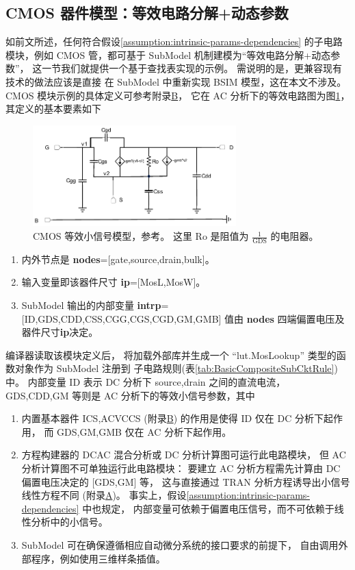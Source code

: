 \subsection{CMOS 器件模型：等效电路分解+动态参数}\label{subsec:cmos-model}
如前文所述，任何符合假设\ref{assumption:intrinsic-params-dependencies}
的子电路模块，例如 CMOS 管，都可基于 SubModel 机制建模为“等效电路分解+动态参数”，
这一节我们就提供一个基于查找表实现的示例。
需说明的是，更兼容现有技术的做法应该是直接
在 SubModel 中重新实现 BSIM 模型\cite{chauhan2012bsim}，这在本文不涉及。
CMOS 模块示例的具体定义可参考附录\hyperref[appendix:mos-subckt]{B}，
它在 AC 分析下的等效电路图为图\ref{fig:mos-small-signal-model-2}，
其定义的基本要素如下
\begin{figure}[htpb]
  \centering
  \includegraphics[width=0.7\textwidth]{fig/mos-small-signal-model-2.pdf}
  \caption{CMOS 等效小信号模型，参考\cite[Figure 2.39]{razavi2002design}。
  这里 Ro 是阻值为 $\frac{1}{\text{GDS}}$ 的电阻器。}
  \label{fig:mos-small-signal-model-2}
\end{figure}
\begin{enumerate}[partopsep=0pt,topsep=0pt,itemsep=0pt,parsep=0pt]
  \item 内外节点是 \textbf{nodes}=[gate,source,drain,bulk]。
  \item 输入变量即该器件尺寸 \textbf{ip}=[MosL,MosW]。
  \item SubModel 输出的内部变量
    \textbf{intrp}=[ID,GDS,CDD,CSS,CGG,CGS,CGD,GM,GMB]
    值由 \textbf{nodes} 四端偏置电压及器件尺寸\textbf{ip}决定。
\end{enumerate}
编译器读取该模块定义后，
将加载外部库并生成一个 “lut.MosLookup” 类型的函数对象作为 SubModel 注册到
子电路规则(表\ref{tab:BasicCompositeSubCktRule})中。
内部变量 ID 表示 DC 分析下 source,drain 之间的直流电流，
GDS,CDD,GM 等则是 AC 分析下的等效小信号参数，其中
\begin{enumerate}[partopsep=0pt,topsep=0pt,itemsep=0pt,parsep=0pt]
  \item 内置基本器件 ICS,ACVCCS (附录\hyperref[appendix:mos-subckt]{B})
    的作用是使得 ID 仅在 DC 分析下起作用，
    而 GDS,GM,GMB 仅在 AC 分析下起作用。
  \item 方程构建器的 DCAC 混合分析或 DC 分析计算图可运行此电路模块，
    但 AC 分析计算图不可单独运行此电路模块：
    要建立 AC 分析方程需先计算由 DC 偏置电压决定的 [GDS,GM] 等，
    这与直接通过 TRAN 分析方程诱导出小信号线性方程不同
    (附录\hyperref[appendix:TRAN-to-AC-equation]{A})。
    事实上，假设\ref{assumption:intrinsic-params-dependencies} 中也规定，
    内部变量可依赖于偏置电压信号，而不可依赖于线性分析中的小信号。
  \item SubModel 可在确保遵循相应自动微分系统的接口要求的前提下，
    自由调用外部程序，例如使用三维样条插值。
\end{enumerate}
